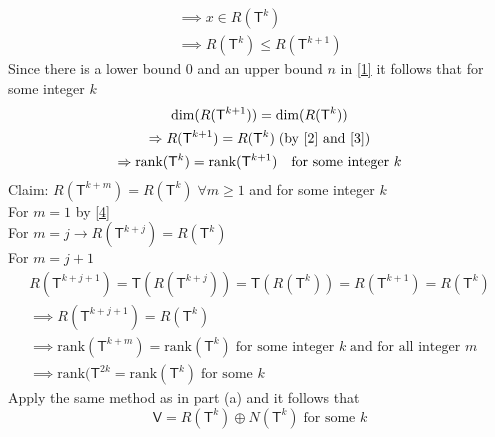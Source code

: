 \begin{enumerate}[(a)]
\begin{gather}
\implies x \in R(\mathsf{T}^k)\\
\implies R(\mathsf{T}^k) \leq R(\mathsf{T}^{k+1}) \label{2}
\end{gather}
Since there is a lower bound 0 and an upper bound $n$ in \ref{1} it
follows that for some integer $k$
\begin{gather}
\text{dim}(R(\mathsf{T}^{k+1})) =
\text{dim}(R(\mathsf{T}^k)) \label{3}\\
\implies R(\mathsf{T}^{k+1}) = R(\mathsf{T}^k) \; (\text{by  \ref{2}
and \ref{3}}) \label{4}\\
\implies \text{rank}(\mathsf{T}^k) = \text{rank}(\mathsf{T}^{k+1})
\quad \text{for some integer } k
\end{gather}
Claim: $R\left(\mathsf{T}^{k+m}\right) = R(\mathsf{T}^k)\;\forall m
\geq 1$ and for some integer $k$
\\For $m=1$ by \ref{4}\\
For $m=j \rightarrow R(\mathsf{T}^{k+j}) = R(\mathsf{T}^k)$\\
For $m = j+1$
\begin{gather}
R\left(\mathsf{T}^{k+j+1}\right) =
\mathsf{T}\left(R\left(\mathsf{T}^{k+j}\right)\right) = 
\mathsf{T}\left(R\left(\mathsf{T}^k\right)\right) =
R\left(\mathsf{T}^{k+1}\right) = R\left(\mathsf{T}^k\right)\\
\implies R\left(\mathsf{T}^{k+j+1}\right) = R\left(\mathsf{T}^k\right)\\
\implies \text{rank}\left(\mathsf{T}^{k+m}\right) =\text{rank}\left(\mathsf{T}^k\right)\;
\text{for some integer } k\; \text{and for all integer } m\\
\implies \text{rank}(\mathsf{T}^{2k} = \text{rank}(\mathsf{T}^k) \;
\text{for some } k
\end{gather}
Apply the same method as in part (a) and it follows that
\begin{equation}
\mathsf{V} = R(\mathsf{T}^k)\oplus N(\mathsf{T}^k)\; \text{for some } k
\end{equation}
\end{enumerate}

